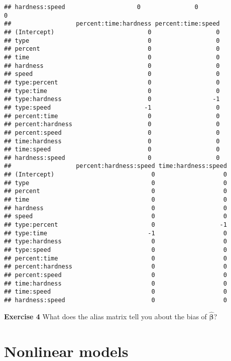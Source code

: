 \documentclass[
]{article}
\begin{document}
\begin{verbatim}
## hardness:speed                    0               0                   0
##                  percent:time:hardness percent:time:speed
## (Intercept)                          0                  0
## type                                 0                  0
## percent                              0                  0
## time                                 0                  0
## hardness                             0                  0
## speed                                0                  0
## type:percent                         0                  0
## type:time                            0                  0
## type:hardness                        0                 -1
## type:speed                          -1                  0
## percent:time                         0                  0
## percent:hardness                     0                  0
## percent:speed                        0                  0
## time:hardness                        0                  0
## time:speed                           0                  0
## hardness:speed                       0                  0
##                  percent:hardness:speed time:hardness:speed
## (Intercept)                           0                   0
## type                                  0                   0
## percent                               0                   0
## time                                  0                   0
## hardness                              0                   0
## speed                                 0                   0
## type:percent                          0                  -1
## type:time                            -1                   0
## type:hardness                         0                   0
## type:speed                            0                   0
## percent:time                          0                   0
## percent:hardness                      0                   0
## percent:speed                         0                   0
## time:hardness                         0                   0
## time:speed                            0                   0
## hardness:speed                        0                   0
\end{verbatim}

\textbf{Exercise 4} What does the alias matrix tell you about the bias
of \(\hat{\boldsymbol{\beta}}\)?

\hypertarget{nonlinear-models}{%
\section{Nonlinear models}\label{nonlinear-models}}
\end{document}
